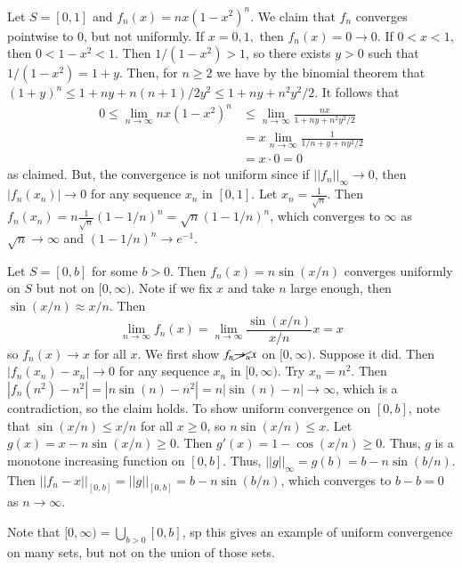 \begin{eg}
    Let $S = [0,1]$ and $f_n(x) = nx(1-x^2)^n$. We claim that $f_n$ converges pointwise to $0$, but not uniformly. If $x = 0,1,$ then $f_n(x) = 0\rightarrow 0$. If $0 < x < 1$, then $0 < 1-x^2 < 1$. Then $1/(1-x^2) > 1$, so there exists $y > 0$ such that $1/(1-x^2) = 1+y$. Then, for $n \geq 2$ we have by the binomial theorem that $(1+y)^n \leq 1 + ny + n(n+1)/2y^2 \leq 1 +ny + n^2y^2/2$. It follows that \begin{align*}
        0 \leq \lim\limits_{n\rightarrow \infty}nx(1-x^2)^n &\leq \lim\limits_{n\rightarrow \infty}\frac{nx}{1+ny+n^2y^2/2} \tag{for some $y > 0$} \\
        &= x\lim\limits_{n\rightarrow \infty}\frac{1}{1/n+y+ny^2/2} \\
        &= x\cdot 0 = 0
    \end{align*}
    as claimed. But, the convergence is not uniform since if $||f_n||_{\infty}\rightarrow 0$, then $|f_n(x_n)|\rightarrow 0$ for any sequence $x_n$ in $[0,1]$. Let $x_n = \frac{1}{\sqrt{n}}$. Then $f_n(x_n) = n\frac{1}{\sqrt{n}}(1-1/n)^n = \sqrt{n}(1-1/n)^n$, which converges to $\infty$ as $\sqrt{n}\rightarrow \infty$ and $(1-1/n)^n\rightarrow e^{-1}$.
\end{eg}

\begin{eg}
    Let $S = [0,b]$ for some $b > 0$. Then $f_n(x) = n\sin(x/n)$ converges uniformly on $S$ but not on $[0,\infty)$. Note if we fix $x$ and take $n$ large enough, then $\sin(x/n) \approx x/n$. Then $$\lim\limits_{n\rightarrow \infty}f_n(x) = \lim\limits_{n\rightarrow \infty}\frac{\sin(x/n)}{x/n}x = x$$ so $f_n(x)\rightarrow x$ for all $x$. We first show $f_n\cancel{\rightarrow_u} x$ on $[0,\infty)$. Suppose it did. Then $|f_n(x_n)-x_n|\rightarrow 0$ for any sequence $x_n$ in $[0,\infty)$. Try $x_n = n^2$. Then $|f_n(n^2) - n^2| = |n\sin(n)-n^2| = n|\sin(n) - n|\rightarrow \infty$, which is a contradiction, so the claim holds. To show uniform convergence on $[0,b]$, note that $\sin(x/n) \leq x/n$ for all $x \geq 0$, so $n\sin(x/n) \leq x$. Let $g(x) = x-n\sin(x/n) \geq 0$. Then $g'(x) = 1-\cos(x/n) \geq 0$. Thus, $g$ is a monotone increasing function on $[0,b]$. Thus, $||g||_{\infty} = g(b) = b-n\sin(b/n)$. Then $||f_n - x||_{[0,b]} = ||g||_{[0,b]} = b-n\sin(b/n)$, which converges to $b-b = 0$ as $n\rightarrow \infty$.
\end{eg}

Note that $[0,\infty) = \bigcup_{b > 0}[0,b]$, sp this gives an example of uniform convergence on many sets, but not on the union of those sets.





